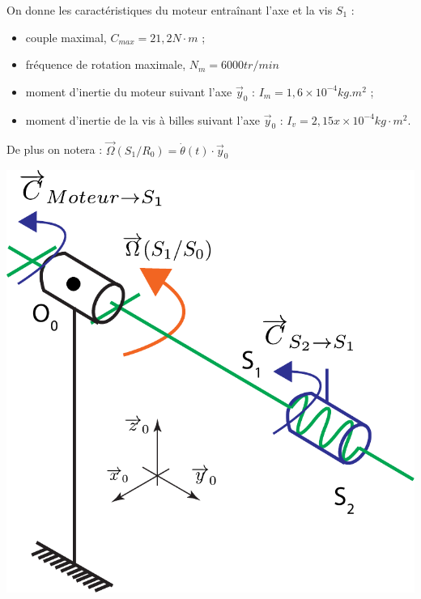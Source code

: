 \documentclass[10pt,fleqn]{article} %
\begin{document}
\begin{exemple}
\begin{minipage}{0.5\textwidth}
On donne les caractéristiques du moteur entraînant l'axe et la vis $S_1$ :
\begin{itemize}
\item couple maximal, $C_{max} = 21,2 N\cdot m$ ;
\item fréquence de rotation maximale, $N_m = 6000 tr/min$
\item moment d'inertie du moteur suivant l'axe $\overrightarrow{y}_0$ : $I_m = 1,6 \times 10^{-4} kg.m^2$ ;
\item moment d'inertie de la vis à billes suivant l'axe $\overrightarrow{y}_0$ : $I_v = 2,15 x\times 10^{-4} kg\cdot m^2$.
\end{itemize}
De plus on notera : $\overrightarrow{\Omega}(S_1/R_0)=\dot{\theta}(t)\cdot \overrightarrow{y}_0$
\end{minipage}
\begin{minipage}{0.45\textwidth}
\begin{center}
\includegraphics[width=1.0\textwidth]{images/schema_cine_depose_rotation.pdf}
\end{center}
\end{minipage}


\end{exemple}
\end{document}
